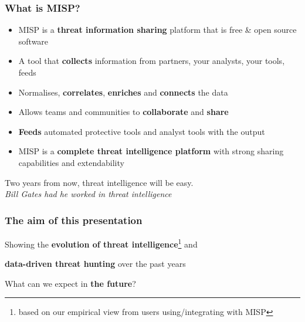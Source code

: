 
\begin{frame}
\titlepage
\end{frame}

\begin{frame}
\frametitle{What is MISP?}
\begin{itemize}
       \item MISP is a {\bf threat information sharing} platform that is free \& open source software
       \item A tool that {\bf collects} information from partners, your analysts, your tools, feeds
       \item Normalises, {\bf correlates}, {\bf enriches} and {\bf connects} the data
       \item Allows teams and communities to {\bf collaborate} and {\bf share}
       \item {\bf Feeds} automated protective tools and analyst tools with the output
       \item MISP is a {\bf complete threat intelligence platform} with strong sharing capabilities and extendability
\end{itemize}
\end{frame}

\begin{frame}[plain,c]
    \begin{center}
    {\Huge Two years from now, threat intelligence will be easy.\\}
        {\it Bill Gates had he worked in threat intelligence}
    \end{center}
\end{frame}


\begin{frame}
  \frametitle{The aim of this presentation}
  \begin{itemize}
      \item {\Large Showing the {\bf evolution of threat intelligence}\footnote{based on our empirical view from users using/integrating with MISP} and 
      \item {\bf data-driven threat hunting} over the past years}
      \item {\Large What can we expect in {\bf the future}?}
  \end{itemize}
\end{frame}

